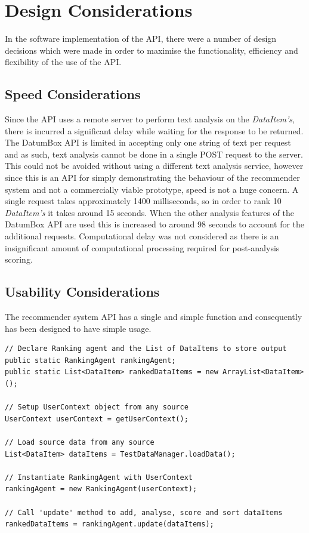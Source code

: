 \section{Design Considerations}

In the software implementation of the API, there were a number of design decisions which were made in order to maximise the functionality, efficiency and flexibility of the use of the API. 

\subsection{Speed Considerations}

Since the API uses a remote server to perform text analysis on the \emph{DataItem's}, there is incurred a significant delay while waiting for the response to be returned. The DatumBox API is limited in accepting only one string of text per request and as such, text analysis cannot be done in a single POST request to the server. This could not be avoided without using a different text analysis service, however since this is an API for simply demonstrating the behaviour of the recommender system and not a commercially viable prototype, speed is not a huge concern. 
A single request takes approximately 1400 milliseconds, so in order to rank 10 \emph{DataItem's} it takes around 15 seconds. When the other analysis features of the DatumBox API are used this is increased to around 98 seconds to account for the additional requests. 
Computational delay was not considered as there is an insignificant amount of computational processing required for post-analysis scoring. 

\subsection{Usability Considerations}

The recommender system API has a single and simple function and consequently has been designed to have simple usage. 

\lstset{language=Java, caption=API usage example, label=APIUsageExample}
\begin{lstlisting}
// Declare Ranking agent and the List of DataItems to store output
public static RankingAgent rankingAgent;
public static List<DataItem> rankedDataItems = new ArrayList<DataItem>();

// Setup UserContext object from any source
UserContext userContext = getUserContext();

// Load source data from any source
List<DataItem> dataItems = TestDataManager.loadData();

// Instantiate RankingAgent with UserContext
rankingAgent = new RankingAgent(userContext); 

// Call 'update' method to add, analyse, score and sort dataItems
rankedDataItems = rankingAgent.update(dataItems);
\end{lstlisting}

